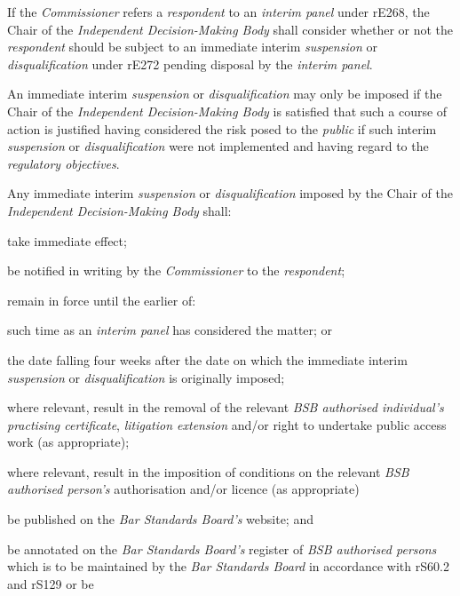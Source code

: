 \par
If the \emph{Commissioner} refers a \emph{respondent} to
an \emph{interim panel} under\textbf{ }rE268, the Chair of
the\emph{ Independent Decision-Making Body} shall consider whether or
not the \emph{respondent} should be subject to an immediate
interim \emph{suspension} or \emph{disqualification} under rE272 pending
disposal by the \emph{interim panel}.\\
\par
An immediate interim \emph{suspension} or \emph{disqualification} may
only be imposed if the Chair of the \emph{Independent Decision-Making
Body} is satisfied that such a course of action is justified having
considered the risk posed to the \emph{public} if such
interim \emph{suspension} or \emph{disqualification} were not
implemented and having regard to the \emph{regulatory objectives}.\\
\par
Any immediate
interim \emph{suspension} or \emph{disqualification} imposed by the
Chair of the \emph{Independent Decision-Making Body} shall:\\\nl \item take immediate effect;\item be notified in writing by the \emph{Commissioner} to
the \emph{respondent};\item remain in force until the earlier of:\al
\item  such time as an \emph{interim panel} has considered the matter; or\\
\item  the date falling four weeks after the date on which the immediate
interim \emph{suspension} or \emph{disqualification} is originally
imposed;\la\item where relevant, result in the removal of the relevant \emph{BSB
authorised individual's} \emph{practising certificate}, \emph{litigation
extension} and/or right to undertake public access work (as
appropriate);\item where relevant, result in the imposition of conditions on the
relevant \emph{BSB authorised person's} authorisation\textbf{ }and/or
licence (as appropriate)\item be published on the \emph{Bar Standards Board's} website; and\item be annotated on the \emph{Bar Standards Board's} register
of \emph{BSB authorised persons} which is to be maintained by
the \emph{Bar Standards Board} in accordance with rS60.2 and rS129 or be
